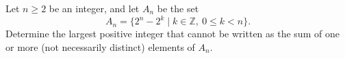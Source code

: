 Let $n \geq 2$ be an integer, and let $A_n$ be the set
\[ A_n = \{2^n - 2^k \mid k \in \mathbb{Z}, \ 0 \leq k < n\}. \]
Determine the largest positive integer that cannot be written as the sum of one or more (not necessarily distinct) elements of $A_n$.
